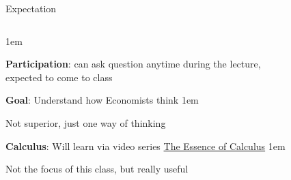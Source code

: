 \documentclass[11pt,aspectratio=43,usenames,dvipsnames]{beamer}
\let\olditemize=\itemize
\let\endolditemize=\enditemize
\renewenvironment{itemize}{\olditemize \itemsep1em}{\endolditemize}
\theoremstyle{definition}
\begin{document}
\begin{frame}{Expectation}
\label{slide:Expectation}
    \begin{columns}
        \begin{column}{0.6\textwidth}
            \begin{itemize}
                \item \textbf{Participation}: can ask question anytime during the lecture, expected to \alert{come to class}
                \item \textbf{Goal}: Understand how \alert{Economists} think
                \begin{itemize}
                    \item Not superior, just \alert{one way of thinking}
                \end{itemize}
                \item \textbf{Calculus}: Will learn via video series \alert{\href{https://www.youtube.com/watch?v=WUvTyaaNkzM&list=PLZHQObOWTQDMsr9K-rj53DwVRMYO3t5Yr}{The Essence of Calculus}}
                \begin{itemize}
                    \item Not the focus of this class, but really useful
                \end{itemize}
            \end{itemize}
        \end{column}
        \begin{column}{0.4\textwidth}
            \begin{figure}

\end{figure}
\end{column}
\end{columns}
\end{frame}
\end{document}

